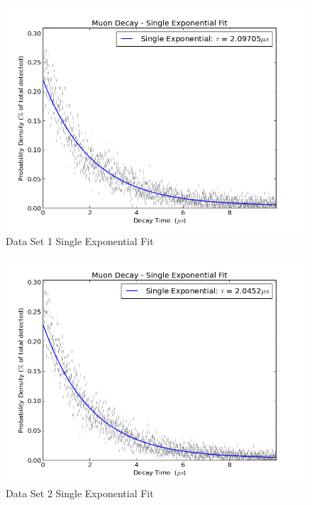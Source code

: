 \begin{figure}[H]
\begin{center}
\includegraphics[width=4 in]{graph_EPBB1_SnglExp.png}
\caption{Data Set 1 Single Exponential Fit}
\end{center}
\end{figure}

\begin{figure}[H]
\begin{center}
\includegraphics[width=4 in]{graph_EPBB2_SnglExp.png}
\caption{Data Set 2 Single Exponential Fit}
\end{center}
\end{figure}

